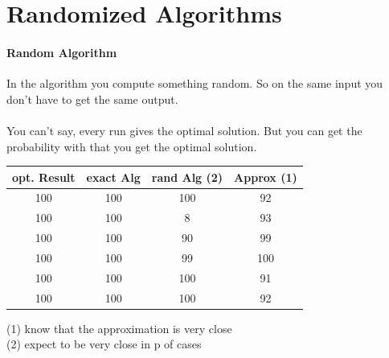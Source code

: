 \section{Randomized Algorithms}
\paragraph{Random Algorithm} In the algorithm you compute something random. So on the same input you don't have to get the same output.\\ \\
You can't say, every run gives the optimal solution. But you can get the probability with that you get the optimal solution. \\
\begin{center}
\begin{tabular}{|c|c|c|c|}\hline
	opt. Result & exact Alg & rand Alg (2)& Approx (1)\\ \hline 
	100 & 100 & 100 & 92\\
	100 & 100 & 8& 93\\
	100 & 100 & 90& 99 \\
	100 & 100 & 99& 100 \\
	100 & 100 & 100 & 91\\
	100 & 100 & 100 & 92\\\hline 
\end{tabular}
\end{center}
(1) know that the approximation is very close \\
(2) expect to be very close in p of cases \\



